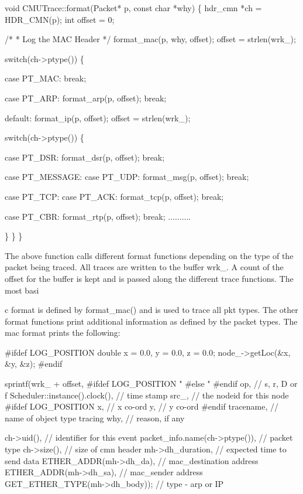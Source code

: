 \begin{program}
void CMUTrace::format(Packet* p, const char *why)
\{
	hdr_cmn *ch = HDR_CMN(p);
	int offset = 0;

	/*
	 * Log the MAC Header
	 */
	format_mac(p, why, offset);
	offset = strlen(wrk_);

	switch(ch->ptype()) \{

	case PT_MAC:
		break;

	case PT_ARP:
		format_arp(p, offset);
		break;

	default:
		format_ip(p, offset);
		offset = strlen(wrk_);

		switch(ch->ptype()) \{

		case PT_DSR:
			format_dsr(p, offset);
			break;

		case PT_MESSAGE:
		case PT_UDP:
			format_msg(p, offset);
			break;
			
		case PT_TCP:
		case PT_ACK:
			format_tcp(p, offset);
			break;
			
		case PT_CBR:
			format_rtp(p, offset);
			break;
		..........

		\}
	\}
\}
\end{program}
The above function calls different format functions depending on the type of the packet being traced. All traces are written to the buffer wrk\_. A count of the offset for the buffer is kept and is passed along the different trace functions. The most basi









c format is defined by format\_mac() and is used to trace all pkt types. The other format functions print additional information as defined by the packet types. The mac format prints the following:

\begin{program}
\#ifdef LOG_POSITION
        double x = 0.0, y = 0.0, z = 0.0;
        node_->getLoc(&x, &y, &z);
\#endif

	sprintf(wrk_ + offset,
\#ifdef LOG_POSITION
		"%
\#else
		"%
\#endif
		op,                    // s, r, D or f
		Scheduler::instance().clock(),  // time stamp
                src_,                  // the nodeid for this node
\#ifdef LOG_POSITION
                x,                     // x co-ord 
                y,                     // y co-ord
\#endif
		tracename,             // name of object type tracing
		why,                   // reason, if any

                ch->uid(),             // identifier for this event
		packet_info.name(ch->ptype()), // packet type
		ch->size(),                    // size of cmn header
		mh->dh_duration,       // expected time to send data 
		ETHER_ADDR(mh->dh_da), // mac_destination address
		ETHER_ADDR(mh->dh_sa),         // mac_sender address
		GET_ETHER_TYPE(mh->dh_body));  // type - arp or IP
\end{program}

